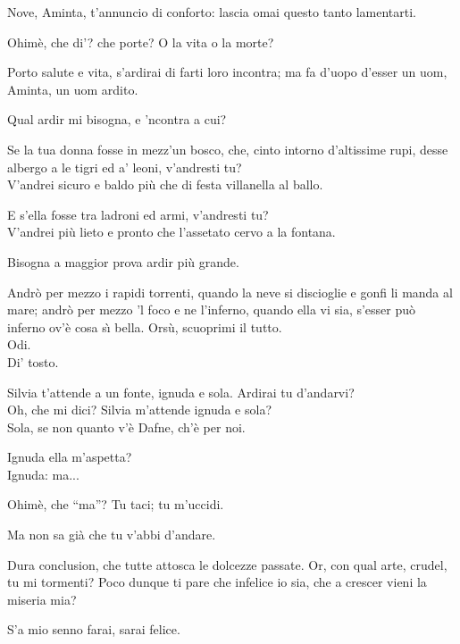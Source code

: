 \documentclass{book}
\begin{document}
	\5 Nove, Aminta, t'annuncio di conforto:
	lascia omai questo tanto lamentarti.

	\4 Ohim\`e, che di'? che porte?
	O la vita o la morte?

	\5 Porto salute e vita, s'ardirai
	di farti loro incontra; ma fa d'uopo
	d'esser un uom, Aminta, un uom ardito.

	\4 Qual ardir mi bisogna, e 'ncontra a cui?

	\5 Se la tua donna fosse in mezz'un bosco,
	che, cinto intorno d'altissime rupi,
	desse albergo a le tigri ed a' leoni,
	v'andresti tu? \\

   \4 V'andrei sicuro e baldo
	pi\`u che di festa villanella al ballo.

	\5 E s'ella fosse tra ladroni ed armi,
	v'andresti tu? \\

   \4 V'andrei pi\`u lieto e pronto
	che l'assetato cervo a la fontana.

	\5 Bisogna a maggior prova ardir pi\`u grande.

	\4 Andr\`o per mezzo i rapidi torrenti,
	quando la neve si discioglie e gonfi
	li manda al mare; andr\`o per mezzo 'l foco
	e ne l'inferno, quando ella vi sia,
	s'esser pu\`o inferno ov'\`e cosa s\`{\i} bella.
	Ors\`u, scuoprimi il tutto. \\

   \5 Odi. \\

   \4 Di' tosto.

	\5 Silvia t'attende a un fonte, ignuda e sola.
	Ardirai tu d'andarvi? \\

   \4 Oh, che mi dici?
	Silvia m'attende ignuda e sola? \\

   \5 Sola,
	se non quanto v'\`e Dafne, ch'\`e per noi.

	\4 Ignuda ella m'aspetta? \\

   \5 Ignuda: ma...

	\4 Ohim\`e, che ``ma''? Tu taci; tu m'uccidi.

	\5 Ma non sa gi\`a che tu v'abbi d'andare.

	\4 Dura conclusion, che tutte attosca
	le dolcezze passate. Or, con qual arte,
	crudel, tu mi tormenti?
	Poco dunque ti pare
	che infelice io sia,
	che a crescer vieni la miseria mia?

	\5 S'a mio senno farai, sarai felice.
\end{document}
